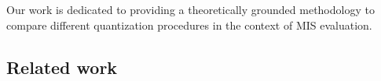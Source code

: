 %
%


Our work is dedicated to providing a theoretically grounded methodology to compare different quantization procedures in the context of MIS evaluation.

\subsection{Related work}

